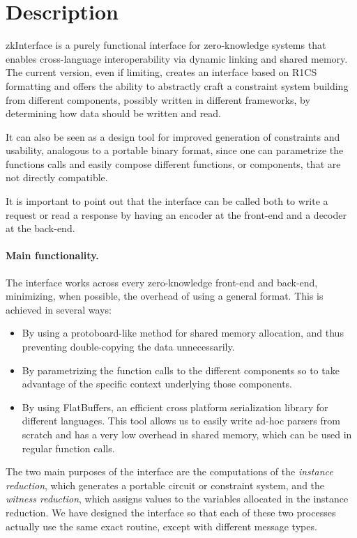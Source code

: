 \section{Description}
		
		zkInterface is a purely functional interface for zero-knowledge systems that enables cross-language interoperability via dynamic linking and shared memory. The current version, even if limiting, creates an interface based on R1CS formatting and offers the ability to abstractly craft a constraint system building from different components, possibly written in different frameworks, by determining how data should be written and read. 
		
		It can also be seen as a design tool for improved generation of constraints and usability, analogous to a portable binary format, since one can parametrize the functions calls and easily compose different functions, or components, that are not directly compatible.
		
		It is important to point out that the interface can be called both to write a request or read a response by having an encoder at the front-end  and a decoder at the back-end. 
		
		\paragraph{Main functionality.}
		
		The interface works across every zero-knowledge front-end and back-end, minimizing, when possible, the overhead of using a general format. This is achieved in several ways:
        
        \begin{itemize}
			\item By using a protoboard-like method for shared memory allocation, and thus preventing double-copying the data unnecessarily.
			\item By parametrizing the function calls to the different components so to take advantage of the specific context underlying those components.
			\item By using FlatBuffers, an efficient cross platform serialization library for different languages. This tool allows us to easily write ad-hoc parsers from scratch and has a very low overhead in shared memory, which can be used in regular function calls. 
		\end{itemize}
		
		
        
        The two main purposes of the interface are the computations of the \emph{instance reduction}, which generates a portable circuit or constraint system, and the \emph{witness reduction}, which assigns values to the variables allocated in the instance reduction. We have designed the interface so that each of these two processes actually use the same exact routine, except with different message types.


